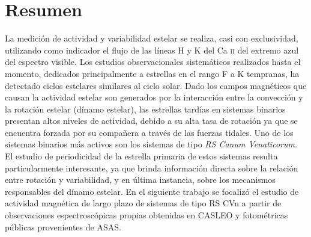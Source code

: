 ﻿\chapter*{Resumen}  %



    

La medición de actividad y variabilidad estelar se realiza, casi con exclusividad, utilizando como indicador el flujo de las líneas H y K del Ca \textsc{ii} del extremo azul del espectro visible. Los estudios observacionales sistemáticos realizados hasta el momento, dedicados principalmente a estrellas en el rango F a K tempranas, ha detectado ciclos estelares similares al ciclo solar. Dado los campos magnéticos que causan la actividad estelar son generados por la interacción entre la convección y la rotación estelar (dínamo estelar), las estrellas tardías en sistemas binarios presentan altos niveles de actividad, debido a su alta tasa de rotación ya que se encuentra forzada por su compañera a través de las fuerzas tidales. Uno de los sistemas binarios más activos son los sistemas de tipo \textit{RS Canum Venaticorum}. El estudio de periodicidad de la estrella primaria de estos sistemas resulta particularmente interesante, ya que brinda información directa sobre la relación entre rotación y variabilidad, y en última instancia, sobre los mecanismos responsables del dínamo estelar. En el siguiente trabajo se focalizó el estudio de actividad magnética de largo plazo de sistemas de tipo RS CVn a partir de observaciones espectroscópicas propias obtenidas en CASLEO y fotométricas públicas provenientes de ASAS.
    
    
    

